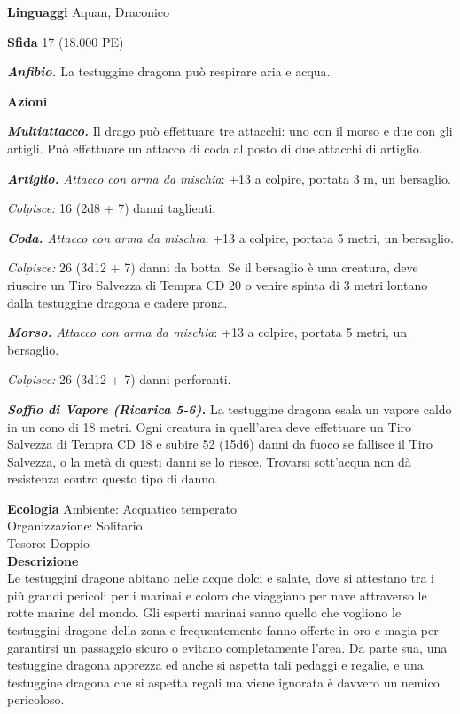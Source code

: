 \begin{multicols}{2}
\textbf{Linguaggi} Aquan, Draconico

\textbf{Sfida} 17 (18.000 PE)

\emph{\textbf{Anfibio.}} La testuggine dragona può respirare aria e acqua.

\textbf{Azioni}

\emph{\textbf{Multiattacco.}} Il drago può effettuare tre attacchi: uno con il morso e due con gli artigli. Può effettuare un attacco di coda al posto di due attacchi di artiglio.

\emph{\textbf{Artiglio.} Attacco con arma da mischia}: +13 a colpire, portata 3 m, un bersaglio.

\emph{Colpisce:} 16 (2d8 + 7) danni taglienti.

\emph{\textbf{Coda.} Attacco con arma da mischia}: +13 a colpire, portata 5 metri, un bersaglio.

\emph{Colpisce:} 26 (3d12 + 7) danni da botta. Se il bersaglio è una creatura, deve riuscire un Tiro Salvezza di Tempra CD 20 o venire spinta di 3 metri lontano dalla testuggine dragona e cadere prona.

\emph{\textbf{Morso.} Attacco con arma da mischia}: +13 a colpire, portata 5 metri, un bersaglio.

\emph{Colpisce:} 26 (3d12 + 7) danni perforanti.

\emph{\textbf{Soffio di Vapore (Ricarica 5-6).}} La testuggine dragona esala un vapore caldo in un cono di 18 metri. Ogni creatura in quell'area deve effettuare un Tiro Salvezza di Tempra CD 18 e subire 52 (15d6) danni da fuoco se fallisce il Tiro Salvezza, o la metà di questi danni se lo riesce. Trovarsi sott'acqua non dà resistenza contro questo tipo di danno.

\textbf{Ecologia}
Ambiente: Acquatico temperato\\
Organizzazione: Solitario\\
Tesoro: Doppio\\
\textbf{Descrizione}\\
Le testuggini dragone abitano nelle acque dolci e salate, dove si attestano tra i più grandi pericoli per i marinai e coloro che viaggiano per nave attraverso le rotte marine del mondo. Gli esperti marinai sanno quello che vogliono le testuggini dragone della zona e frequentemente fanno offerte in oro e magia per garantirsi un passaggio sicuro o evitano completamente l'area. Da parte sua, una testuggine dragona apprezza ed anche si aspetta tali pedaggi e regalie, e una testuggine dragona che si aspetta regali ma viene ignorata è davvero un nemico pericoloso.\\


\end{multicols}
